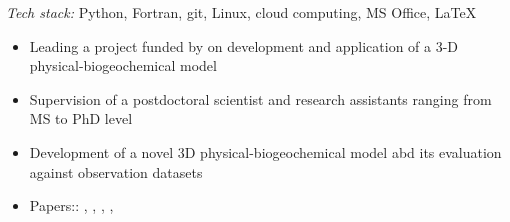\documentclass[
	a4paper,
]{fortysecondscv}
\begin{document}
\begin{cvtable}[1.0]
{\begin{changemargin}{-45pt}{0pt}
\begin{itemize}[topsep=0pt,itemsep=0pt,partopsep=0pt, parsep=0pt, leftmargin=*]
      \href{https://doi.org/10.3389/fmars.2023.1129951}{\color{pblue}{11}} %
    \end{itemize}
    \end{changemargin}
    }
    
	{\href{https://www.hereon.de/}{\color{pblue}{Helmholtz-Zentrum Hereon, Germany}}}
	{
	\textit{Tech stack:} Python, Fortran, git, Linux, cloud computing, MS Office, \LaTeX
	\begin{changemargin}{-45pt}{0pt}
	\begin{itemize}[topsep=0pt,itemsep=0pt,partopsep=0pt, parsep=0pt, leftmargin=*]
        \item Leading a project funded by \href{https://www.umweltbundesamt.de/en}{\color{pblue}{UBA}} on development and application of a 3-D physical-biogeochemical model %
        \item Supervision of a postdoctoral scientist and research assistants ranging from MS to PhD level
        \item Development of a novel 3D physical-biogeochemical model abd its evaluation against observation datasets
        \item Papers::
            \href{https://doi.org/10.3389/fevo.2016.00131}{\color{pblue}{1}}, %
            \href{https://doi.org/10.5194/bg-14-4499-2017}{\color{pblue}{2}}, %
            \href{https://doi.org/10.1016/j.ecolmodel.2017.07.008}{\color{pblue}{3}}, %
            \href{https://doi.org/10.5194/gmd-11-915-2018}{\color{pblue}{4}}, %

\end{itemize}
\end{changemargin}}
\end{cvtable}
\end{document}
